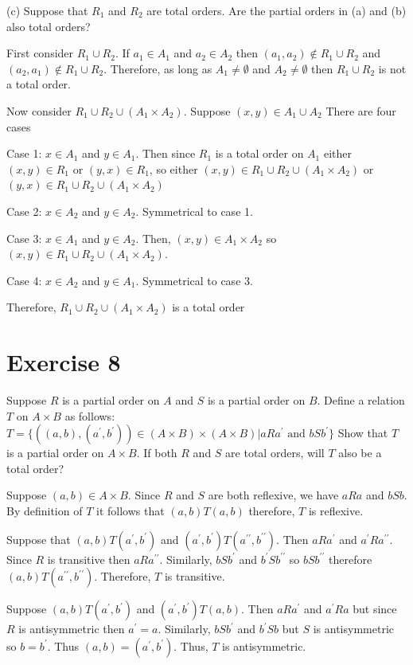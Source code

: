 \documentclass[11pt]{article}
\newcommand{\dprime}{{\prime \prime}}
\begin{document}
\noindent (c) Suppose that $R_1$ and $R_2$ are total orders. Are the partial 
orders in (a) and (b) also total orders?

First consider $R_1 \cup R_2$. If $a_1 \in A_1$ and $a_2 \in A_2$ then 
$(a_1, a_2) \notin R_1 \cup R_2$ and $(a_2, a_1) \notin R_1 \cup R_2$. 
Therefore, as long as $A_1 \neq \emptyset$ and $A_2 \neq \emptyset$ then 
$R_1 \cup R_2$ is not a total order.

Now consider $R_1 \cup R_2 \cup (A_1 \times A_2)$. 
Suppose $(x, y) \in A_1 \cup A_2$ There are four cases 

Case 1: $x \in A_1$ and $y \in A_1$. Then since $R_1$ is a total order on $A_1$
either $(x, y) \in R_1$ or $(y, x) \in R_1$, so either 
$(x, y) \in R_1 \cup R_2 \cup (A_1 \times A_2)$ or 
$(y,x) \in R_1 \cup R_2 \cup (A_1 \times A_2)$

Case 2: $x \in A_2$ and $y \in A_2$. Symmetrical to case 1.

Case 3: $x \in A_1$ and $y \in A_2$. Then, $(x, y) \in A_1 \times A_2$ so 
$(x, y) \in R_1 \cup R_2 \cup (A_1 \times A_2)$.

Case 4: $x \in A_2$ and $y \in A_1$. Symmetrical to case 3.

Therefore, $R_1 \cup R_2 \cup (A_1 \times A_2)$ is a total order

\section*{Exercise 8}

Suppose $R$ is a partial order on $A$ and $S$ is a partial order on $B$.
Define a relation $T$ on $A \times B$ as follows: 
$T = \{((a, b), (a^\prime, b^\prime)) \in (A \times B) \times (A \times B) | aRa^\prime \text{ and } bSb^\prime\}$
Show that $T$ is a partial order on $A \times B$. If both $R$ and $S$ are total 
orders, will $T$ also be a total order?

Suppose $(a, b) \in A \times B$. Since $R$ and $S$ are both reflexive, we have 
$aRa$ and $bSb$. By definition of $T$ it follows that $(a,b)T(a,b)$ therefore,
$T$ is reflexive.

Suppose that $(a,b)T(a^\prime, b^\prime)$ and 
$(a^\prime, b^\prime)T(a^\dprime, b^\dprime)$. 
Then $aRa^\prime$ and $a^\prime R a^\dprime$. Since $R$ is transitive then
$aRa^\dprime$. Similarly, $bSb^\prime$ and $b^\prime S b^\dprime$ so 
$bSb^\dprime$ therefore $(a, b)T(a^\dprime, b^\dprime)$.  Therefore, $T$ is 
transitive.

Suppose $(a, b) T (a^\prime, b^\prime)$ and $(a^\prime, b^\prime) T (a,b)$. 
Then $aRa^\prime$ and $a^\prime R a$ but since $R$ is antisymmetric then 
$a^\prime = a$. Similarly, $bSb^\prime$ and $b^\prime Sb$ but $S$ is antisymmetric
so $b = b^\prime$. Thus $(a,b) = (a^\prime,b^\prime)$. Thus, $T$ is antisymmetric.
\end{document}
